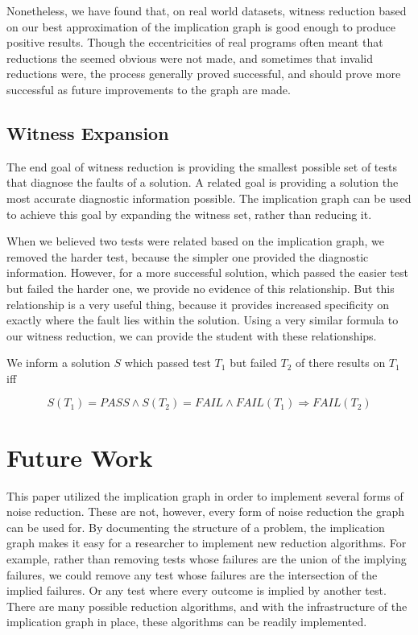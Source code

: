 \documentclass[11pt]{article}
\begin{document}
Nonetheless, we have found that, on real world datasets, witness reduction based on our best approximation of the implication graph is good enough to produce positive results. Though the eccentricities of real programs often meant that reductions the seemed obvious were not made, and sometimes that invalid reductions were, the process generally proved successful, and should prove more successful as future improvements to the graph are made.

\subsection{Witness Expansion}

The end goal of witness reduction is providing the smallest possible set of tests that diagnose the faults of a solution. A related goal is providing a solution the most accurate diagnostic information possible. The implication graph can be used to achieve this goal by expanding the witness set, rather than reducing it.

When we believed two tests were related based on the implication graph, we removed the harder test, because the simpler one provided the diagnostic information. However, for a more successful solution, which passed the easier test but failed the harder one, we provide no evidence of this relationship. But this relationship is a very useful thing, because it provides increased specificity on exactly where the fault lies within the solution. Using a very similar formula to our witness reduction, we can provide the student with these relationships.

\centerline{We inform a solution $S$ which passed test $T_1$ but failed $T_2$ of there results on  $T_1$ iff}
$$ S(T_1) = PASS \wedge S(T_2) = FAIL \wedge FAIL(T_1) \Rightarrow FAIL(T_2)$$



\section{Future Work}
This paper utilized the implication graph in order to implement several forms of noise reduction. These are not, however, every form of noise reduction the graph can be used for. By documenting the structure of a problem, the implication graph makes it easy for a researcher to implement new reduction algorithms. For example, rather than removing tests whose failures are the union of the implying failures, we could remove any test whose failures are the intersection of the implied failures. Or any test where every outcome is implied by another test. There are many possible reduction algorithms, and with the infrastructure of the implication graph in place, these algorithms can be readily implemented.
\end{document}
